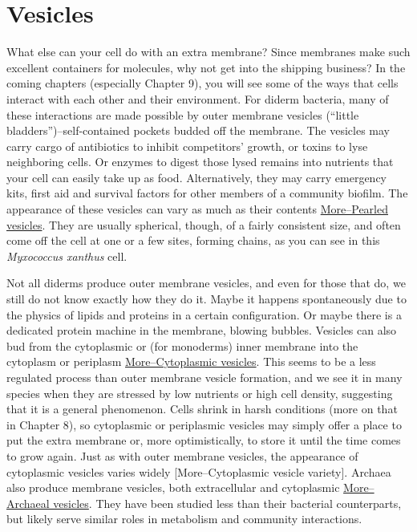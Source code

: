 \documentclass[]{tufte-book}
\begin{document}
\section{Vesicles}\label{vesicles}

What else can your cell do with an extra membrane? Since membranes make
such excellent containers for molecules, why not get into the shipping
business? In the coming chapters (especially Chapter 9), you will see
some of the ways that cells interact with each other and their
environment. For diderm bacteria, many of these interactions are made
possible by outer membrane vesicles (``little
bladders'')--self-contained pockets budded off the membrane. The
vesicles may carry cargo of antibiotics to inhibit competitors' growth,
or toxins to lyse neighboring cells. Or enzymes to digest those lysed
remains into nutrients that your cell can easily take up as food.
Alternatively, they may carry emergency kits, first aid and survival
factors for other members of a community biofilm. The appearance of
these vesicles can vary as much as their contents
\protect\hyperlink{moretubular-vesicles}{More--Pearled vesicles}. They
are usually spherical, though, of a fairly consistent size, and often
come off the cell at one or a few sites, forming chains, as you can see
in this \emph{Myxococcus xanthus} cell.

Not all diderms produce outer membrane vesicles, and even for those that
do, we still do not know exactly how they do it. Maybe it happens
spontaneously due to the physics of lipids and proteins in a certain
configuration. Or maybe there is a dedicated protein machine in the
membrane, blowing bubbles. Vesicles can also bud from the cytoplasmic or
(for monoderms) inner membrane into the cytoplasm or periplasm
\protect\hyperlink{morecytoplasmic-vesicles}{More--Cytoplasmic
vesicles}. This seems to be a less regulated process than outer membrane
vesicle formation, and we see it in many species when they are stressed
by low nutrients or high cell density, suggesting that it is a general
phenomenon. Cells shrink in harsh conditions (more on that in Chapter
8), so cytoplasmic or periplasmic vesicles may simply offer a place to
put the extra membrane or, more optimistically, to store it until the
time comes to grow again. Just as with outer membrane vesicles, the
appearance of cytoplasmic vesicles varies widely {[}More--Cytoplasmic
vesicle variety{]}. Archaea also produce membrane vesicles, both
extracellular and cytoplasmic
\protect\hyperlink{morearchaeal-vesicles}{More--Archaeal vesicles}. They
have been studied less than their bacterial counterparts, but likely
serve similar roles in metabolism and community interactions.
\end{document}

